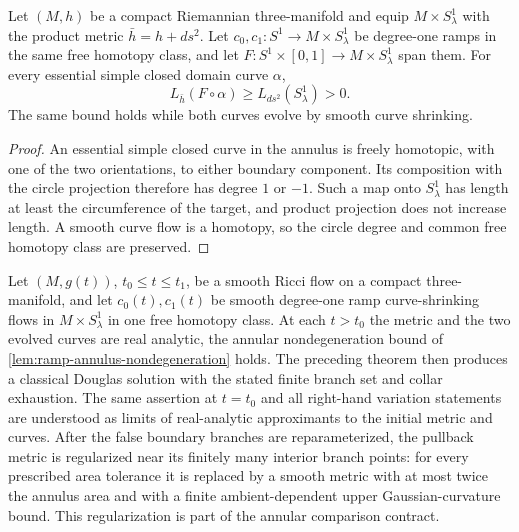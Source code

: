 \begin{lemma}
\label{lem:ramp-annulus-nondegeneration}
\notready
Let $(M,h)$ be a compact Riemannian three-manifold and equip
$M\times S^1_\lambda$ with the product metric $\bar h=h+ds^2$.  Let
$c_0,c_1\colon S^1\to M\times S^1_\lambda$ be degree-one ramps in the
same free homotopy class, and let
$F\colon S^1\times[0,1]\to M\times S^1_\lambda$ span them.  For every
essential simple closed domain curve $\alpha$,
\[
 L_{\bar h}(F\circ\alpha)\ge L_{ds^2}(S^1_\lambda)>0.
\]
The same bound holds while both curves evolve by smooth curve shrinking.
\end{lemma}

\begin{proof}
An essential simple closed curve in the annulus is freely homotopic, with one
of the two orientations, to either boundary component.  Its composition with
the circle projection therefore has degree $1$ or $-1$.  Such a map onto
$S^1_\lambda$ has length at least the circumference of the target, and product
projection does not increase length.  A smooth curve flow is a homotopy, so
the circle degree and common free homotopy class are preserved.
\end{proof}

\begin{lemma}
\label{lem:smooth-annular-minimizer-bridge}
\notready
Let $(M,g(t))$, $t_0\le t\le t_1$, be a smooth Ricci flow on a compact
three-manifold, and let $c_0(t),c_1(t)$ be smooth degree-one ramp
curve-shrinking flows in $M\times S^1_\lambda$ in one free homotopy class.
At each $t>t_0$ the metric and the two evolved curves are real analytic, the
annular nondegeneration bound of
\ref{lem:ramp-annulus-nondegeneration} holds.  The preceding theorem then
produces a classical Douglas solution with the stated finite branch set and
collar exhaustion.  The same assertion at $t=t_0$ and all right-hand
variation statements are understood as limits of real-analytic approximants
to the initial metric and curves.
After the false boundary branches are reparameterized, the pullback metric is
regularized near its finitely many interior branch points: for every prescribed
area tolerance it is replaced by a smooth metric with at most twice the
annulus area and with a finite ambient-dependent upper Gaussian-curvature
bound.  This regularization is part of the annular comparison contract.
\end{lemma}


